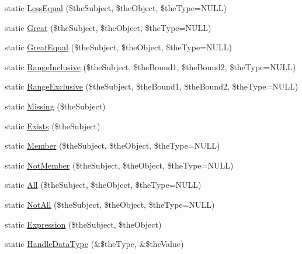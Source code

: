 \begin{DoxyCompactItemize}
static \hyperlink{class_c_query_statement_a292880d593cc8b46dba77d13004aaa28}{Less\-Equal} (\$the\-Subject, \$the\-Object, \$the\-Type=N\-U\-L\-L)
\item 
static \hyperlink{class_c_query_statement_abe09c835887534aeecbeffad2045c917}{Great} (\$the\-Subject, \$the\-Object, \$the\-Type=N\-U\-L\-L)
\item 
static \hyperlink{class_c_query_statement_a540d93d646384d5a145d3944d72246e3}{Great\-Equal} (\$the\-Subject, \$the\-Object, \$the\-Type=N\-U\-L\-L)
\item 
static \hyperlink{class_c_query_statement_ae18f91d3c6c1ad07bb380d959ce01c1b}{Range\-Inclusive} (\$the\-Subject, \$the\-Bound1, \$the\-Bound2, \$the\-Type=N\-U\-L\-L)
\item 
static \hyperlink{class_c_query_statement_a182c44c738d574e6d331d5bd894ce8e7}{Range\-Exclusive} (\$the\-Subject, \$the\-Bound1, \$the\-Bound2, \$the\-Type=N\-U\-L\-L)
\item 
static \hyperlink{class_c_query_statement_a45c462050093bf18a5065cb018c91a34}{Missing} (\$the\-Subject)
\item 
static \hyperlink{class_c_query_statement_aba90304323e0de3966810bf1bed26ef4}{Exists} (\$the\-Subject)
\item 
static \hyperlink{class_c_query_statement_a5e1a291d73a20b4f88c019d1863a4c81}{Member} (\$the\-Subject, \$the\-Object, \$the\-Type=N\-U\-L\-L)
\item 
static \hyperlink{class_c_query_statement_aeb90f2ea2237ddc0ab01d9965538abf4}{Not\-Member} (\$the\-Subject, \$the\-Object, \$the\-Type=N\-U\-L\-L)
\item 
static \hyperlink{class_c_query_statement_a7cb662f303eb30652460fd4903053ca8}{All} (\$the\-Subject, \$the\-Object, \$the\-Type=N\-U\-L\-L)
\item 
static \hyperlink{class_c_query_statement_ac3c86273637210e1d117cae10ff9bfe9}{Not\-All} (\$the\-Subject, \$the\-Object, \$the\-Type=N\-U\-L\-L)
\item 
static \hyperlink{class_c_query_statement_ae668b0a35863ac739a188cecd84027a5}{Expression} (\$the\-Subject, \$the\-Object)
\item 
static \hyperlink{class_c_query_statement_a4427bfe3eff17ec663ecf7a5f77c23d8}{Handle\-Data\-Type} (\&\$the\-Type, \&\$the\-Value)
\end{DoxyCompactItemize}


